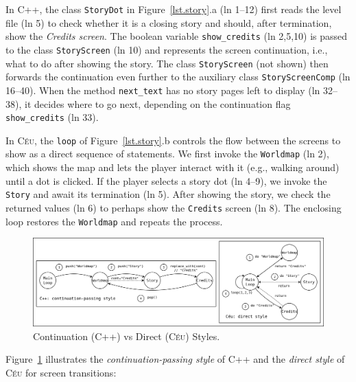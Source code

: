 \documentclass[10pt, conference, compsocconf]{IEEEtran}
\newcommand{\CEU}{\textsc{C\'{e}u}\xspace}
\newcommand{\code}[1] {{\small{\texttt{#1}}}}
\begin{document}
In C++, the class \code{StoryDot} in Figure~\ref{lst.story}.a (ln 1--12) first
reads the level file (ln 5) to check whether it is a closing story and should,
after termination, show the \emph{Credits screen}.
%
The boolean variable \code{show\_credits} (ln 2,5,10) is passed to the class
\code{StoryScreen} (ln 10) and represents the screen continuation, i.e., what
to do after showing the story.
The class \code{StoryScreen} (not shown) then forwards the continuation even
further to the auxiliary class \code{StoryScreenComp} (ln 16--40).
%
When the method \code{next\_text} has no story pages left to display
(ln 32--38), it decides where to go next, depending on the continuation flag
\code{show\_credits} (ln 33).

In \CEU, the \code{loop} of Figure~\ref{lst.story}.b controls the flow between
the screens to show as a direct sequence of statements.
%
We first invoke the \code{Worldmap} (ln 2), which shows the map and lets
the player interact with it (e.g., walking around) until a dot is clicked.
If the player selects a story dot (ln 4--9), we invoke the \code{Story}
and await its termination (ln 5).
After showing the story, we check the returned values (ln 6) to perhaps show
the \code{Credits} screen (ln 8).
The enclosing loop restores the \code{Worldmap} and repeats the process.

\begin{figure}
\centering
\includegraphics[width=\textwidth]{continuation}
\caption{ Continuation (C++) vs Direct (\CEU) Styles.
\label{fig.story}
}
\end{figure}

Figure~\ref{fig.story} illustrates the \emph{continuation-passing style} of
C++ and the \emph{direct style} of \CEU for screen transitions:
\end{document}
